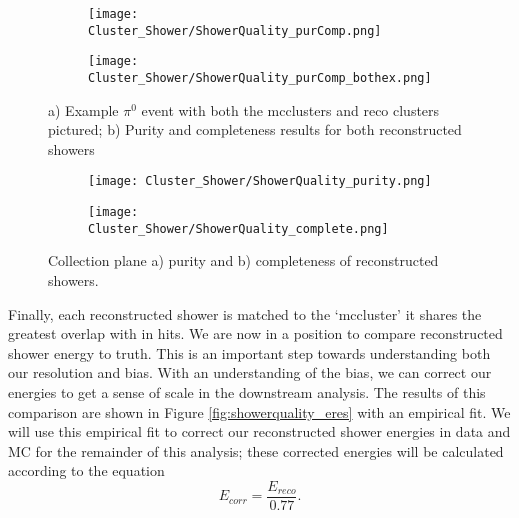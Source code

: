 \begin{figure}[t!]
\centering
  \begin{subfigure}[t]{0.4\textwidth}
    \centering
\texttt{[image: Cluster\_Shower/ShowerQuality\_purComp.png]}
  \caption{ }
  \end{subfigure} 
  \hspace{5mm}
  \begin{subfigure}[t]{0.45\textwidth}
    \centering
\texttt{[image: Cluster\_Shower/ShowerQuality\_purComp\_bothex.png]}
  \caption{ }
  \end{subfigure} 
\caption{a) Example $\pi^0$ event with both the mcclusters and reco clusters pictured; b) Purity and completeness results for both reconstructed showers }
\label{fig:showerquality_purcompex}
\end{figure}


\begin{figure}[t!]
\centering
  \begin{subfigure}[t]{0.45\textwidth}
    \centering
\texttt{[image: Cluster\_Shower/ShowerQuality\_purity.png]}
  \caption{ }
  \end{subfigure} 
  \hspace{3mm}
  \begin{subfigure}[t]{0.45\textwidth}
    \centering
\texttt{[image: Cluster\_Shower/ShowerQuality\_complete.png]}
  \caption{ }
  \end{subfigure} 
\caption{Collection plane a) purity and b) completeness of reconstructed showers. }
\label{fig:showerquality_purcomp}
\end{figure}

\par  Finally, each reconstructed shower is matched to the `mccluster' it shares the greatest overlap with in hits. We are now in a position to compare reconstructed shower energy to truth. This is an important step towards understanding both our resolution and bias. With an understanding of the bias, we can correct our energies to get a sense of scale in the downstream analysis. The results of this comparison are shown in Figure \ref{fig:showerquality_eres} with an empirical fit. We will use this empirical fit to correct our reconstructed shower energies in data and MC for the remainder of this analysis; these corrected energies will be calculated according to the equation
\begin{equation}
\label{eq:ecorr}
E_{corr} = \frac{E_{reco}}{0.77} .
\end{equation}

